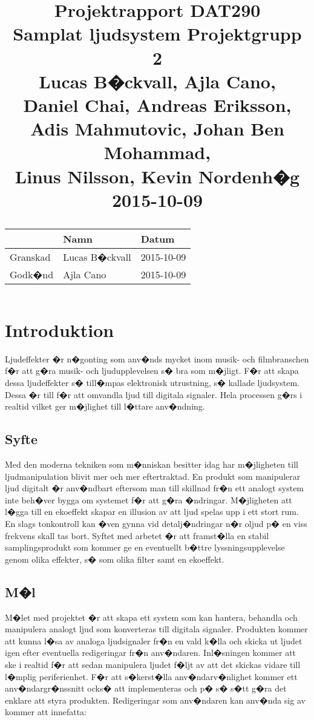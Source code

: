 \documentclass[a4paper]{article}
\title{
{\bf Projektrapport DAT290}\\
\vspace{0.2cm}
%
%
Samplat ljudsystem Projektgrupp 2\\ 
\vspace{1cm}
%
%
Lucas B�ckvall, Ajla Cano,  \\
Daniel Chai, Andreas Eriksson,\\
 Adis Mahmutovic, Johan Ben Mohammad, \\
 Linus Nilsson, Kevin Nordenh�g\\
\vspace{1cm}
2015-10-09\\
\vspace{7cm}
%
%
%
%
\normalsize{
  \begin{tabular}{|l|l|l|}  \hline
              & \bf Namn                           & \bf Datum   \\ \hline \hline
     Granskad &    Lucas B�ckvall                   & 2015-10-09  \\ \hline
     Godk�nd  &        Ajla Cano           & 2015-10-09  \\ \hline
  \end{tabular}}
}
\date{}
\begin{document}
\maketitle
\thispagestyle{empty}

\tableofcontents
\newpage


\section{Introduktion}
Ljudeffekter �r n�gonting som anv�nds mycket inom musik- och filmbranschen f�r att g�ra musik- och ljudupplevelsen s� bra som m�jligt. F�r att skapa dessa ljudeffekter s� till�mpas elektronisk utrustning, s� kallade ljudsystem. Dessa �r till f�r att omvandla ljud till digitala signaler. Hela processen g�rs i realtid vilket ger m�jlighet till l�ttare anv�ndning.
\newline


\subsection{Syfte}

Med den moderna tekniken som m�nniskan besitter idag har m�jligheten till ljudmanipulation blivit mer och mer eftertraktad. En produkt som manipulerar ljud digitalt �r anv�ndbart eftersom man till skillnad fr�n ett analogt system inte beh�ver bygga om systemet f�r att g�ra �ndringar. M�jligheten att l�gga till en ekoeffekt skapar en illusion av att ljud spelas upp i ett stort rum. En slags tonkontroll kan �ven gynna vid detalj�ndringar n�r oljud p� en viss frekvens skall tas bort. Syftet med arbetet �r att framst�lla en stabil samplingsprodukt som kommer ge en eventuellt b�ttre lyssningsupplevelse genom olika effekter, s� som olika filter samt en ekoeffekt.

\subsection{M�l}

M�let med projektet �r att skapa ett system som kan hantera, behandla och manipulera analogt ljud som konverteras till digitala signaler. Produkten kommer att kunna l�sa av analoga ljudsignaler fr�n en vald k�lla och skicka ut ljudet igen efter eventuella redigeringar fr�n anv�ndaren. Inl�sningen kommer att ske i realtid f�r att sedan manipulera ljudet f�ljt av att det skickas vidare till l�mplig periferienhet. 
F�r att s�kerst�lla anv�ndarv�nlighet kommer ett anv�ndargr�nssnitt ocks� att implementeras och p� s� s�tt g�ra det enklare att styra produkten. Redigeringar som anv�ndaren kan anv�nda sig av kommer att innefatta:
\end{document}

